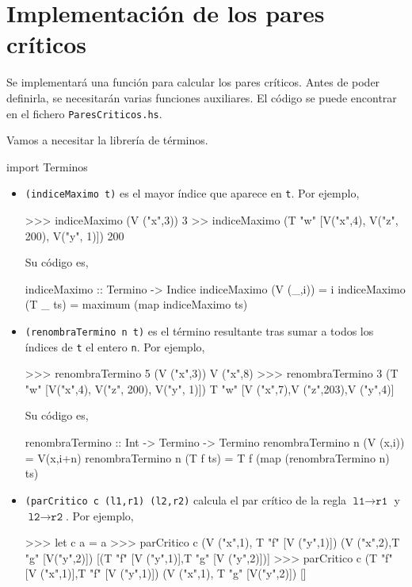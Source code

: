 \section{Implementación de los pares críticos}

Se implementará una función para calcular los pares críticos. Antes
de poder definirla, se necesitarán varias funciones auxiliares. El
código se puede encontrar en el fichero \texttt{ParesCriticos.hs}.

Vamos a necesitar la librería de términos.
\begin{codigo}
import Terminos
\end{codigo}

\begin{itemize}
\item \texttt{(indiceMaximo t)} es el mayor índice que aparece en
  \texttt{t}. Por ejemplo,
\begin{sesion}
>>> indiceMaximo (V ("x",3))
3
>> indiceMaximo (T "w" [V("x",4), V("z", 200), V("y", 1)])
200
\end{sesion}

Su código es,

\begin{codigo}
indiceMaximo :: Termino -> Indice
indiceMaximo (V (_,i)) = i
indiceMaximo (T _ ts) = maximum (map indiceMaximo ts)
\end{codigo}

\item \texttt{(renombraTermino n t)}
  es el término resultante tras sumar a todos los índices de
  \texttt{t} el entero \texttt{n}. Por ejemplo,
\begin{sesion}
>>> renombraTermino 5 (V ("x",3)) 
V ("x",8)
>>> renombraTermino 3 (T "w" [V("x",4), V("z", 200), V("y", 1)])
T "w" [V ("x",7),V ("z",203),V ("y",4)]
\end{sesion}

Su código es,

\begin{codigo}
renombraTermino :: Int -> Termino -> Termino
renombraTermino n (V (x,i)) = V(x,i+n)
renombraTermino n (T f ts) = T f (map (renombraTermino n) ts)
\end{codigo}

\item \texttt{(parCritico c (l1,r1) (l2,r2)}  calcula el par crítico de la
  regla $\texttt{l1} \rightarrow \texttt{r1}$ y
  $\texttt{l2} \rightarrow \texttt{r2}$. Por ejemplo,
\begin{sesion}
>>> let c a = a
>>> parCritico c (V ("x",1), T "f" [V ("y",1)])
                 (V ("x",2),T "g" [V("y",2)])
[(T "f" [V ("y",1)],T "g" [V ("y",2)])]
>>> parCritico c (T "f" [V ("x",1)],T "f" [V ("y",1)])
               (V ("x",1), T "g" [V("y",2)])
[]
\end{sesion}


\end{itemize}
